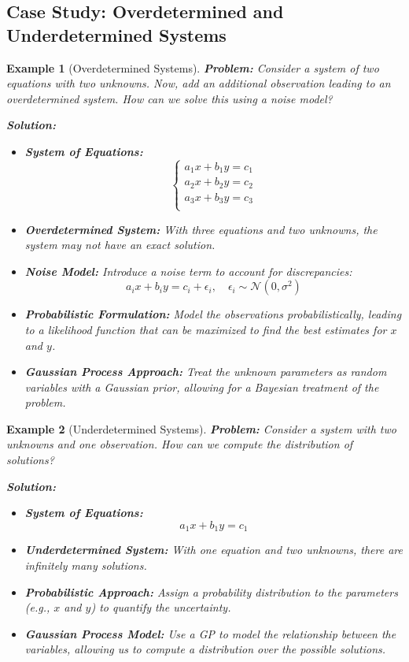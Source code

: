 \documentclass[12pt]{article}
\newtheorem{example}{Example}
\begin{document}
\subsection{Case Study: Overdetermined and Underdetermined Systems}
\begin{example}[Overdetermined Systems]
    \textbf{Problem:} Consider a system of two equations with two unknowns. Now, add an additional observation leading to an overdetermined system. How can we solve this using a noise model?
    
    \textbf{Solution:}
    \begin{itemize}
        \item \textbf{System of Equations:} 
        \[
        \begin{cases}
        a_1 x + b_1 y = c_1 \\
        a_2 x + b_2 y = c_2 \\
        a_3 x + b_3 y = c_3 \\
        \end{cases}
        \]
        \item \textbf{Overdetermined System:} With three equations and two unknowns, the system may not have an exact solution.
        \item \textbf{Noise Model:} Introduce a noise term to account for discrepancies:
        \[
        a_i x + b_i y = c_i + \epsilon_i, \quad \epsilon_i \sim \mathcal{N}(0, \sigma^2)
        \]
        \item \textbf{Probabilistic Formulation:} Model the observations probabilistically, leading to a likelihood function that can be maximized to find the best estimates for \( x \) and \( y \).
        \item \textbf{Gaussian Process Approach:} Treat the unknown parameters as random variables with a Gaussian prior, allowing for a Bayesian treatment of the problem.
    \end{itemize}
\end{example}

\begin{example}[Underdetermined Systems]
    \textbf{Problem:} Consider a system with two unknowns and one observation. How can we compute the distribution of solutions?
    
    \textbf{Solution:}
    \begin{itemize}
        \item \textbf{System of Equations:} 
        \[
        a_1 x + b_1 y = c_1
        \]
        \item \textbf{Underdetermined System:} With one equation and two unknowns, there are infinitely many solutions.
        \item \textbf{Probabilistic Approach:} Assign a probability distribution to the parameters (e.g., \( x \) and \( y \)) to quantify the uncertainty.
        \item \textbf{Gaussian Process Model:} Use a GP to model the relationship between the variables, allowing us to compute a distribution over the possible solutions.
    \end{itemize}
\end{example}
\end{document}
